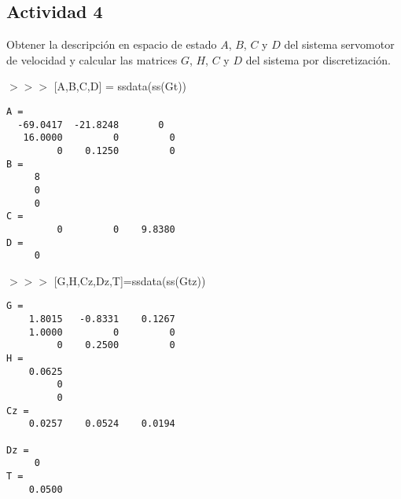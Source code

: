 \newpage
\subsection{Actividad 4}
Obtener la descripción en espacio de estado $A$, $B$, $C$ y $D$
del sistema servomotor de velocidad y calcular las matrices $G$, $H$,
$C$ y $D$ del sistema por discretización.

\begin{tcolorbox}[sharp corners, colframe=bluebox, title= Espacio de
  estados continuo.]
$>>>$ [A,B,C,D] = ssdata(ss(Gt))
  \vspace*{0.5em}
  \begin{tcolorbox}[sharp corners, colback = white]
    \color{gray}
\begin{verbatim}
A =
  -69.0417  -21.8248       0
   16.0000         0         0
         0    0.1250         0
B =
     8
     0
     0
C =
         0         0    9.8380
D =
     0
\end{verbatim}
  \end{tcolorbox}%
  \vspace*{0.5em}
\end{tcolorbox}%



\begin{tcolorbox}[sharp corners, colframe=bluebox, title= Espacio de
  estados discretos.]
$>>>$ [G,H,Cz,Dz,T]=ssdata(ss(Gtz))
  \vspace*{0.5em}
  \begin{tcolorbox}[sharp corners, colback = white]
    \color{gray}
\begin{verbatim}
G =
    1.8015   -0.8331    0.1267
    1.0000         0         0
         0    0.2500         0
H =
    0.0625
         0
         0
Cz =
    0.0257    0.0524    0.0194

Dz =
     0
T =
    0.0500
\end{verbatim}
  \end{tcolorbox}%
  \vspace*{0.5em}
\end{tcolorbox}%

